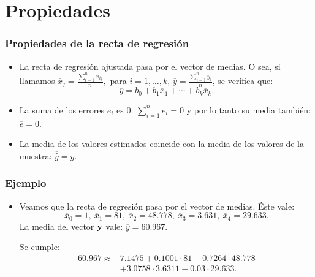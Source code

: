 \section{Propiedades}
\begin{frame}
\frametitle{Propiedades de la recta de regresión}
\begin{itemize}
\item<2->{La recta de regresión ajustada pasa por el vector de
medias. O sea, si llamamos $\overline{x}_j=\frac{\sum\limits_{i=1}^n x_{ij}}{n},$ para $i=1,\ldots,k$, $\overline{y}=\frac{\sum\limits_{i=1}^n y_i}{n}$, se verifica que:
$$
\overline{y}=b_0 + b_1\overline{x}_1+\cdots +b_k \overline{x}_k.
$$}
\item<3->{La suma de los errores $e_i$ es $0$: $\sum\limits_{i=1}^n
e_i=0$ y por lo tanto su media también: $\overline{e}=0$.}
\item<4->{La media de los valores estimados coincide con la media de los valores de la muestra: $\overline{\hat{y}}=\overline{y}$.}
\end{itemize}
\end{frame}
\begin{frame}
\frametitle{Ejemplo}
\begin{itemize}
\item<2->{Veamos que la recta de regresión pasa por el vector de medias. Éste vale:
$$
\overline{x}_0 = 1,\ \overline{x}_1=81,\ \overline{x}_2 =48.778,\ \overline{x}_3=3.631,\ \overline{x}_4 = 29.633.
$$
La media del vector $\mathbf{y}$ vale: $\overline{y}=60.967$.

Se cumple:
$$
\begin{array}{rl}
60.967 \approx  & 7.1475 +  0.1001\cdot 81 +0.7264\cdot 48.778 \\ & +3.0758\cdot 3.6311-0.03\cdot 29.633.
\end{array}
$$
}

\end{itemize}
\end{frame}

